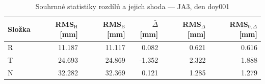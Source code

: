 \begin{table}[H]
\centering
\caption{Souhrnné statistiky rozdílů a jejich shoda — JA3, den doy001}
\label{tab:hermite_vs_bernese_ja3_doy001_summary}
\begin{tabular}{lrrrrr}
\toprule
Složka & RMS$_\mathrm{H}$ [mm] & RMS$_\mathrm{B}$ [mm] & $\bar{\Delta}$ [mm] & RMS$_{\Delta}$ [mm] & RMS$_{0,\Delta}$ [mm] \\
\midrule
R & 11.187 & 11.117 & 0.082 & 0.621 & 0.616 \\
T & 24.693 & 24.869 & -1.352 & 2.322 & 1.888 \\
N & 32.282 & 32.369 & 0.121 & 1.285 & 1.279 \\
\bottomrule
\end{tabular}
\end{table}
